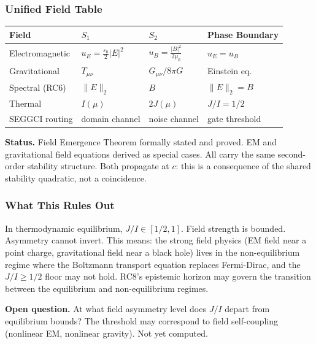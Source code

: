 \documentclass[11pt,twoside]{article}
\begin{document}
\subsubsection{Unified Field Table}

\begin{center}
\begin{tabular}{llll}
\toprule
Field & $S_1$ & $S_2$ & Phase Boundary \\
\midrule
Electromagnetic & $u_E = \frac{\varepsilon_0}{2}|E|^2$ & $u_B = \frac{|B|^2}{2\mu_0}$ & $u_E = u_B$ \\
Gravitational & $T_{\mu\nu}$ & $G_{\mu\nu}/8\pi G$ & Einstein eq. \\
Spectral (RC6) & $\|E\|_2$ & $B$ & $\|E\|_2 = B$ \\
Thermal & $I(\mu)$ & $2J(\mu)$ & $J/I = 1/2$ \\
SEGGCI routing & domain channel & noise channel & gate threshold \\
\bottomrule
\end{tabular}
\end{center}

\begin{confirmedenv}
\textbf{Status.} Field Emergence Theorem formally stated and proved. EM and gravitational
field equations derived as special cases. All carry the same second-order stability structure.
Both propagate at $c$: this is a consequence of the shared stability quadratic,
not a coincidence.
\end{confirmedenv}

\subsubsection{What This Rules Out}

In thermodynamic equilibrium, $J/I \in [1/2, 1]$. Field strength is bounded.
Asymmetry cannot invert. This means: the strong field physics (EM field near a point
charge, gravitational field near a black hole) lives in the non-equilibrium regime
where the Boltzmann transport equation replaces Fermi-Dirac, and the $J/I \geq 1/2$
floor may not hold. RC8's epistemic horizon may govern the transition between
the equilibrium and non-equilibrium regimes.

\begin{pendingenv}
\textbf{Open question.} At what field asymmetry level does $J/I$ depart from
equilibrium bounds? The threshold may correspond to field self-coupling (nonlinear EM,
nonlinear gravity). Not yet computed.
\end{pendingenv}
\end{document}
